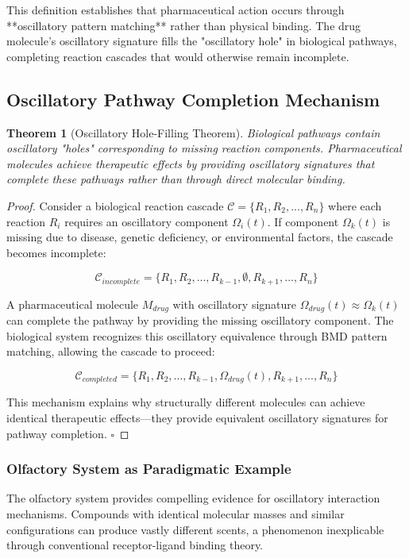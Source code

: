 \documentclass[12pt,a4paper]{article}
\newtheorem{theorem}{Theorem}[section]
\begin{document}
This definition establishes that pharmaceutical action occurs through **oscillatory pattern matching** rather than physical binding. The drug molecule's oscillatory signature fills the "oscillatory hole" in biological pathways, completing reaction cascades that would otherwise remain incomplete.

\subsection{Oscillatory Pathway Completion Mechanism}

\begin{theorem}[Oscillatory Hole-Filling Theorem]
Biological pathways contain oscillatory "holes" corresponding to missing reaction components. Pharmaceutical molecules achieve therapeutic effects by providing oscillatory signatures that complete these pathways rather than through direct molecular binding.
\end{theorem}

\begin{proof}
Consider a biological reaction cascade $\mathcal{C} = \{R_1, R_2, ..., R_n\}$ where each reaction $R_i$ requires an oscillatory component $\Omega_i(t)$. If component $\Omega_k(t)$ is missing due to disease, genetic deficiency, or environmental factors, the cascade becomes incomplete:

$$\mathcal{C}_{incomplete} = \{R_1, R_2, ..., R_{k-1}, \emptyset, R_{k+1}, ..., R_n\}$$

A pharmaceutical molecule $M_{drug}$ with oscillatory signature $\Omega_{drug}(t) \approx \Omega_k(t)$ can complete the pathway by providing the missing oscillatory component. The biological system recognizes this oscillatory equivalence through BMD pattern matching, allowing the cascade to proceed:

$$\mathcal{C}_{completed} = \{R_1, R_2, ..., R_{k-1}, \Omega_{drug}(t), R_{k+1}, ..., R_n\}$$

This mechanism explains why structurally different molecules can achieve identical therapeutic effects—they provide equivalent oscillatory signatures for pathway completion. $\square$
\end{proof}

\subsubsection{Olfactory System as Paradigmatic Example}

The olfactory system provides compelling evidence for oscillatory interaction mechanisms. Compounds with identical molecular masses and similar configurations can produce vastly different scents, a phenomenon inexplicable through conventional receptor-ligand binding theory.
\end{document}
